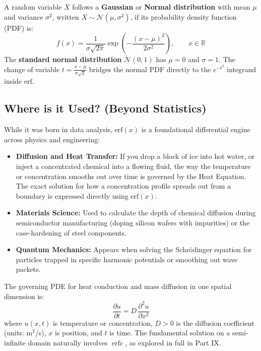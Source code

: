 \documentclass[11pt]{article}
\begin{document}
\begin{defnbox}
A random variable $X$ follows a \textbf{Gaussian} or \textbf{Normal distribution} with mean $\mu$ and variance $\sigma^2$, written $X \sim \mathcal{N}(\mu,\sigma^2)$, if its probability density function (PDF) is:
\[ f(x) = \frac{1}{\sigma\sqrt{2\pi}} \exp\!\left(-\frac{(x-\mu)^2}{2\sigma^2}\right), \qquad x \in \mathbb{R} \]
The \textbf{standard normal distribution} $\mathcal{N}(0,1)$ has $\mu=0$ and $\sigma=1$. The change of variable $t = \frac{x-\mu}{\sigma\sqrt{2}}$ bridges the normal PDF directly to the $e^{-t^2}$ integrand inside $\text{erf}$.
\end{defnbox}

\subsection{Where is it Used? (Beyond Statistics)}

While it was born in data analysis, $\text{erf}(x)$ is a foundational differential engine across physics and engineering:
\begin{itemize}
    \item \textbf{Diffusion and Heat Transfer:} If you drop a block of ice into hot water, or inject a concentrated chemical into a flowing fluid, the way the temperature or concentration smooths out over time is governed by the Heat Equation. The exact solution for how a concentration profile spreads out from a boundary is expressed directly using $\text{erf}(x)$.
    \item \textbf{Materials Science:} Used to calculate the depth of chemical diffusion during semiconductor manufacturing (doping silicon wafers with impurities) or the case-hardening of steel components.
    \item \textbf{Quantum Mechanics:} Appears when solving the Schr\"{o}dinger equation for particles trapped in specific harmonic potentials or smoothing out wave packets.
\end{itemize}

\begin{theorembox}
The governing PDE for heat conduction and mass diffusion in one spatial dimension is:
\[ \frac{\partial u}{\partial t} = D\,\frac{\partial^2 u}{\partial x^2} \]
where $u(x,t)$ is temperature or concentration, $D > 0$ is the diffusion coefficient (units: m$^2$/s), $x$ is position, and $t$ is time. The fundamental solution on a semi-infinite domain naturally involves $\operatorname{erfc}$, as explored in full in Part IX.
\end{theorembox}
\end{document}
